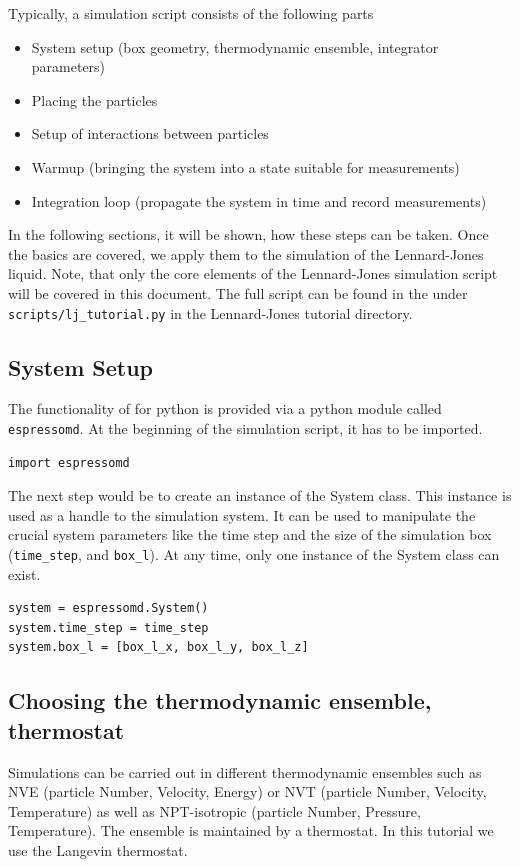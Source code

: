 \documentclass[
paper=a4,                       %
fontsize=11pt,                  %
twoside,                        %
footsepline,                    %
headsepline,                    %
headinclude=false,              %
footinclude=false,              %
pagesize,                       %
]{scrartcl}
\begin{document}
Typically, a simulation script consists of the following parts
\begin{itemize}
\item System setup (box geometry, thermodynamic ensemble, integrator parameters)
\item Placing the particles
\item Setup of interactions between particles
\item Warmup (bringing the system into a state suitable for measurements)
\item Integration loop (propagate the system in time and record measurements)
\end{itemize}
In the following sections, it will be shown, how these steps can be taken. Once the basics are covered, we apply them to the simulation of the Lennard-Jones liquid.
Note, that only the core elements of the Lennard-Jones simulation script will be covered in this document. The full script can be found in the under \verb+scripts/lj_tutorial.py+ in the Lennard-Jones tutorial directory.


\subsection{System Setup}
The functionality of \es{} for
python is provided via a python module called
\texttt{espressomd}. At the beginning of the simulation script, it has to be imported.
\begin{lstlisting}
import espressomd
\end{lstlisting}

The next step would be to create an instance of the System class. 
This instance is used as a handle to the simulation system. It can be used to manipulate the
crucial system parameters like the time step and the size of the simulation box (\texttt{time\_step}, and \texttt{box\_l}). At any time, only one instance of the System class can exist.
\begin{lstlisting}
system = espressomd.System()
system.time_step = time_step
system.box_l = [box_l_x, box_l_y, box_l_z]
\end{lstlisting}
\subsection{Choosing the thermodynamic ensemble, thermostat}
Simulations can be carried out in different thermodynamic ensembles such as NVE (particle
Number, Velocity, Energy) or NVT (particle Number, Velocity, Temperature)
as well as NPT-isotropic (particle Number, Pressure, Temperature). 
The ensemble is maintained by a thermostat. In this tutorial we use the Langevin thermostat.
\end{document}
